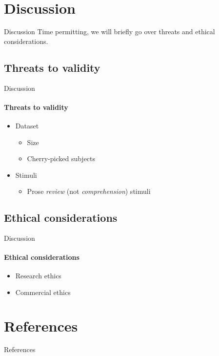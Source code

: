 \documentclass[xcolor={dvipsnames,table},12pt]{beamer}
\begin{document}
\section{Discussion}
\begin{frame}{Discussion}
    Time permitting, we will briefly go over threats and ethical considerations.
\end{frame}


\subsection*{Threats to validity}
\begin{frame}{Discussion}
    \framesubtitle{Threats to validity}

    \begin{itemize}
        \item Dataset
        \begin{itemize}
            \item Size
            \item Cherry-picked subjects
        \end{itemize}
        \item Stimuli
        \begin{itemize}
            \item Prose \emph{review} (not \emph{comprehension}) stimuli
        \end{itemize}
    \end{itemize}
\end{frame}

\subsection*{Ethical considerations}
\begin{frame}{Discussion}
    \framesubtitle{Ethical considerations}

    \begin{itemize}
        \item Research ethics
        \item Commercial ethics
    \end{itemize}
\end{frame}

\section*{References}
\begin{frame}[allowframebreaks]{References}
    \AtNextBibliography{\scriptsize}
    \printbibliography[category=cited]
\end{frame}
\end{document}
